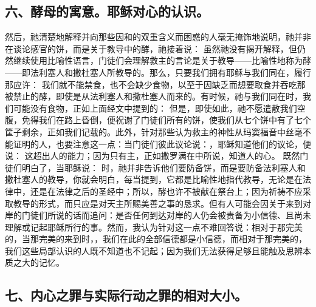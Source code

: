 
\subsection{六、酵母的寓意。耶稣对心的认识。}

然后，祂清楚地解释并向那些因和的双重含义而困惑的人毫无掩饰地说明，祂并非在谈论感官的饼，而是关于教导中的酵，祂接着说： 虽然祂没有揭开解释，但仍然继续使用比喻性语言，门徒们会理解救主的言论是关于教导——比喻性地称为酵——即法利塞人和撒杜塞人所教导的。那么，只要我们拥有耶稣与我们同在，履行那应许： 我们就不能禁食，也不会缺少食物，以至于因缺乏而想要取食并吞吃那被禁止的酵，即使是从法利塞人和撒杜塞人而来的。有时候，祂与我们同在时，我们可能没有食物，正如上面经文中提到的： 但是，即使如此，祂不愿遣散我们空腹，免得我们在路上昏倒，便祝谢了门徒们所有的饼，使我们从七个饼中有了七个筐子剩余，正如我们记载的。此外，针对那些认为救主的神性从玛窦福音中丝毫不能证明的人，也要注意这一点：当门徒们彼此议论说：，耶稣知道他们的议论，便说： 这超出人的能力；因为只有主，正如撒罗满在中所说，知道人的心。 既然门徒们明白了，当耶稣说： 时，祂并非告诉他们要防备饼，而是要防备法利塞人和撒杜塞人的教导，你就会明白，每当提到，它都是比喻性地指代教导，无论是在法律中，还是在法律之后的圣经中；所以，酵也许不被献在祭台上；因为祈祷不应采取教导的形式，而只应是对天主所赐美善之事的恳求。但有人可能会因关于来到对岸的门徒们所说的话而追问：是否任何到达对岸的人仍会被责备为小信德、且尚未理解或记起耶稣所行的事。然而，我认为针对这一点不难回答说：相对于那完美的，当那完美的来到时，，我们在此的全部信德都是小信德，而相对于那完美的，我们这些局部认识的人既不知道也不记起；因为我们无法获得足够且能触及思辨本质之大的记忆。\par


\subsection{七、内心之罪与实际行动之罪的相对大小。}

